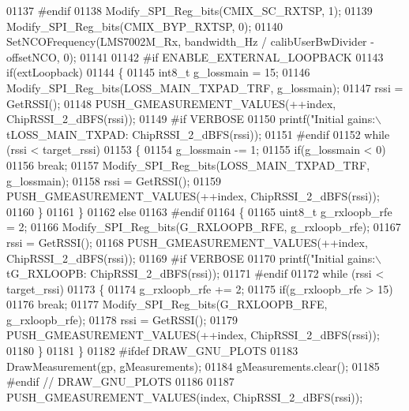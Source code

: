 \begin{DoxyCode}
{{{{{{{{{{{{{{{{{{{{{01137 \textcolor{preprocessor}{#endif}
01138     Modify_SPI_Reg_bits(CMIX_SC_RXTSP, 1);
01139     Modify_SPI_Reg_bits(CMIX_BYP_RXTSP, 0);
01140     SetNCOFrequency(LMS7002M_Rx, bandwidth\_Hz / calibUserBwDivider - offsetNCO, 0);
01141 
01142 \textcolor{preprocessor}{#if ENABLE\_EXTERNAL\_LOOPBACK}
01143     \textcolor{keywordflow}{if}(extLoopback)
01144     \{
01145         int8\_t g\_lossmain = 15;
01146         Modify_SPI_Reg_bits(LOSS_MAIN_TXPAD_TRF, g\_lossmain);
01147         rssi = GetRSSI();
01148         PUSH_GMEASUREMENT_VALUES(++index, ChipRSSI\_2\_dBFS(rssi));
01149 \textcolor{preprocessor}{#if VERBOSE}
01150         printf(\textcolor{stringliteral}{"Initial gains:\(\backslash\)tLOSS\_MAIN\_TXPAD: %
      ChipRSSI\_2\_dBFS(rssi));
01151 \textcolor{preprocessor}{#endif}
01152         \textcolor{keywordflow}{while} (rssi < target\_rssi)
01153         \{
01154             g\_lossmain -= 1;
01155             \textcolor{keywordflow}{if}(g\_lossmain < 0)
01156                 \textcolor{keywordflow}{break};
01157             Modify_SPI_Reg_bits(LOSS_MAIN_TXPAD_TRF, g\_lossmain);
01158             rssi = GetRSSI();
01159             PUSH_GMEASUREMENT_VALUES(++index, ChipRSSI\_2\_dBFS(rssi));
01160         \}
01161     \}
01162     \textcolor{keywordflow}{else}
01163 \textcolor{preprocessor}{#endif}
01164     \{
01165         uint8\_t g\_rxloopb\_rfe = 2;
01166         Modify_SPI_Reg_bits(G_RXLOOPB_RFE, g\_rxloopb\_rfe);
01167         rssi = GetRSSI();
01168         PUSH_GMEASUREMENT_VALUES(++index, ChipRSSI\_2\_dBFS(rssi));
01169 \textcolor{preprocessor}{#if VERBOSE}
01170         printf(\textcolor{stringliteral}{"Initial gains:\(\backslash\)tG\_RXLOOPB: %
      ChipRSSI\_2\_dBFS(rssi));
01171 \textcolor{preprocessor}{#endif}
01172         \textcolor{keywordflow}{while} (rssi < target\_rssi)
01173         \{
01174             g\_rxloopb\_rfe += 2;
01175             \textcolor{keywordflow}{if}(g\_rxloopb\_rfe > 15)
01176                 \textcolor{keywordflow}{break};
01177             Modify_SPI_Reg_bits(G_RXLOOPB_RFE, g\_rxloopb\_rfe);
01178             rssi = GetRSSI();
01179             PUSH_GMEASUREMENT_VALUES(++index, ChipRSSI\_2\_dBFS(rssi));
01180         \}
01181     \}
01182 \textcolor{preprocessor}{#ifdef DRAW\_GNU\_PLOTS}
01183     DrawMeasurement(gp, gMeasurements);
01184     gMeasurements.clear();
01185 \textcolor{preprocessor}{#endif // DRAW\_GNU\_PLOTS}
01186 
01187     PUSH_GMEASUREMENT_VALUES(index, ChipRSSI\_2\_dBFS(rssi));
}}}}}}}}}}}}}}}}}}}}}}}
\end{DoxyCode}
